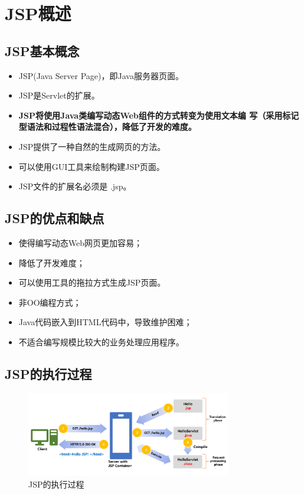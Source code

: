\section{JSP概述}

\subsection{JSP基本概念}

\begin{itemize}
\item JSP(Java Server Page)，即Java服务器页面。
\item JSP是Servlet的扩展。
\item {\bf\Blue JSP将使用Java类编写动态Web组件的方式转变为使用文本编
    写（采用标记型语法和过程性语法混合），降低了开发的难度。}
\item JSP提供了一种自然的生成网页的方法。
\item 可以使用GUI工具来绘制构建JSP页面。
\item JSP文件的扩展名必须是 .jsp。
\end{itemize}

\subsection{JSP的优点和缺点}


\begin{itemize}
\item 使得编写动态Web网页更加容易；
\item 降低了开发难度；
\item 可以使用工具的拖拉方式生成JSP页面。
\end{itemize}


\begin{itemize}
\item 非OO编程方式；
\item Java代码嵌入到HTML代码中，导致维护困难；
\item 不适合编写规模比较大的业务处理应用程序。
\end{itemize}


\subsection{JSP的执行过程} 

\begin{figure}[htb]
\centering
\includegraphics[width=0.8\textwidth]{images/JavaEE-JSP/fig-jsp-process.pdf}
\caption{JSP的执行过程}
\label{fig:fig-jsp-process}
\end{figure}

